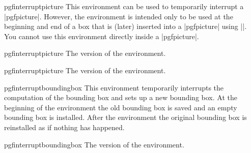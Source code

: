 \begin{environment}{{pgfinterruptpicture}}
    This environment can be used to temporarily interrupt a |{pgfpicture}|.
    However, the environment is intended only to be used at the beginning and
    end of a box that is (later) inserted into a |{pgfpicture}| using
    |\pgfqbox|. You cannot use this environment directly inside a
    |{pgfpicture}|.
\end{environment}

\begin{plainenvironment}{{pgfinterruptpicture}}
    The  version of the environment.
\end{plainenvironment}

\begin{contextenvironment}{{pgfinterruptpicture}}
    The  version of the environment.
\end{contextenvironment}

\begin{environment}{{pgfinterruptboundingbox}}
    This environment temporarily interrupts the computation of the bounding box
    and sets up a new bounding box. At the beginning of the environment the old
    bounding box is saved and an empty bounding box is installed. After the
    environment the original bounding box is reinstalled as if nothing has
    happened.
\end{environment}

\begin{plainenvironment}{{pgfinterruptboundingbox}}
    The  version of the environment.
\end{plainenvironment}

